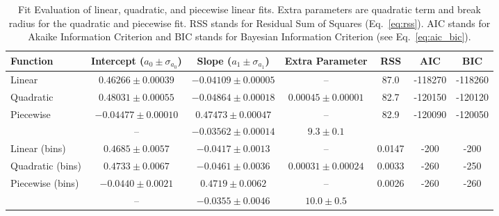 
\begin{table*}
\caption{
Fit Evaluation of linear, quadratic, and piecewise linear fits.
Extra parameters are quadratic term and break radius for the quadratic and piecewise fit.
RSS stands for Residual Sum of Squares (Eq.~\ref{eq:rss}).
AIC stands for Akaike Information Criterion and BIC stands for Bayesian Information Criterion (see Eq.~\ref{eq:aic_bic}).
}
\label{tab:global_fit_results_comparison}
\begin{tabularx}{\textwidth}{lCCCccc}
\hline
Function & Intercept ($a_0 \pm \sigma_{a_0}$) & Slope ($a_1 \pm \sigma_{a_1}$) & Extra Parameter & RSS & AIC & BIC \\
\hline
Linear & $0.46266 \pm 0.00039$  & $-0.04109 \pm 0.00005$ & -- & 87.0 & -118270  & -118260 \\ 
Quadratic & $0.48031 \pm 0.00055$  & $-0.04864 \pm 0.00018$ & $0.00045 \pm 0.00001$ & 82.7 & -120150  & -120120 \\ 
Piecewise & $-0.04477 \pm 0.00010$ & $0.47473 \pm 0.00047$ & -- & 82.9 & -120090  & -120050 \\ 
 & -- & $-0.03562 \pm 0.00014$ & $9.3 \pm 0.1$ & & & \\ 
\hline
Linear (bins)& $0.4685 \pm 0.0057$  & $-0.0417 \pm 0.0013$ & -- & 0.0147 & -200  & -200 \\ 
Quadratic (bins) & $0.4733 \pm 0.0067$  & $-0.0461 \pm 0.0036$ & $0.00031 \pm 0.00024$ & 0.0033 & -260  & -250 \\ 
Piecewise (bins) & $-0.0440 \pm 0.0021$ & $0.4719 \pm 0.0062$ & -- & 0.0026 & -260  & -260 \\ 
 & -- & $-0.0355 \pm 0.0046$ & $10.0 \pm 0.5$ & & & \\ 
\hline
\end{tabularx}
\end{table*}
